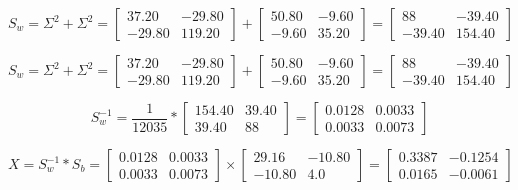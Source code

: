 \documentclass{report}
\begin{document}
\begin{flushleft}
\begin{equation}
S_w = \Sigma^2 + \Sigma^2 = \begin{bmatrix}
37.20 &	-29.80 \\
-29.80 & 119.20
\end{bmatrix} +
 \begin{bmatrix}
50.80 &	-9.60 \\
-9.60 &	35.20
\end{bmatrix} = 
\begin{bmatrix}
88	& -39.40 \\
-39.40 & 154.40
\end{bmatrix}
\end{equation}

\begin{equation}
S_w = \Sigma^2 + \Sigma^2 = \begin{bmatrix}
37.20 &	-29.80 \\
-29.80 & 119.20
\end{bmatrix} +
 \begin{bmatrix}
50.80 &	-9.60 \\
-9.60 &	35.20
\end{bmatrix} = 
\begin{bmatrix}
88	& -39.40 \\
-39.40 & 154.40
\end{bmatrix}
\end{equation}

\begin{equation}
S_w^{-1} = \frac{1}{12035} * \begin{bmatrix}
154.40 & 39.40 \\
39.40 & 88
\end{bmatrix}
=\begin{bmatrix}
0.0128 & 0.0033 \\
0.0033 & 0.0073
\end{bmatrix}
\end{equation}

\begin{equation}
X = S_w^{-1}*S_b = \begin{bmatrix}
0.0128 & 0.0033 \\
0.0033 & 0.0073
\end{bmatrix}
\times
\begin{bmatrix}
 29.16 & -10.80 \\
-10.80 &	4.0
\end{bmatrix}
= 
\begin{bmatrix}
0.3387 & -0.1254 \\
0.0165 & -0.0061
\end{bmatrix}
\end{equation}



\end{flushleft}
\end{document}
